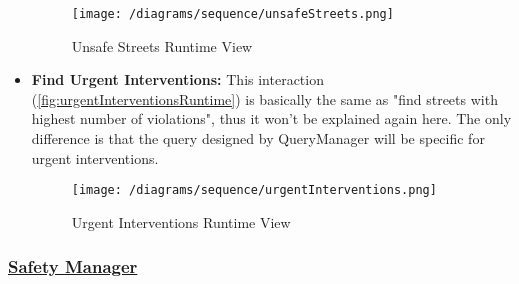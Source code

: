 \begin{itemize}
				\vspace{1cm}		
		
				\begin{figure}[h!]
					\centering
					\texttt{[image: /diagrams/sequence/unsafeStreets.png]}
					\caption{\label{fig:unsafeStreetsRuntime} Unsafe Streets Runtime View}
				\end{figure}
			
				\newpage
			
				\item \textbf{Find Urgent Interventions:} This interaction (\autoref{fig:urgentInterventionsRuntime}) is basically the same as "find streets with highest number of violations", thus it won't be explained again here. The only difference is that the query designed by QueryManager will be specific for urgent interventions.
				
				\begin{figure}[h!]
					\centering
					\texttt{[image: /diagrams/sequence/urgentInterventions.png]}
					\caption{\label{fig:urgentInterventionsRuntime} Urgent Interventions Runtime View}
				\end{figure}
			\end{itemize}
		
			\FloatBarrier
		
		\subsubsection[Safety Manager]{\hyperlink{toc}{Safety Manager}}
			\label{sec.safetyManagerRuntime}
			
